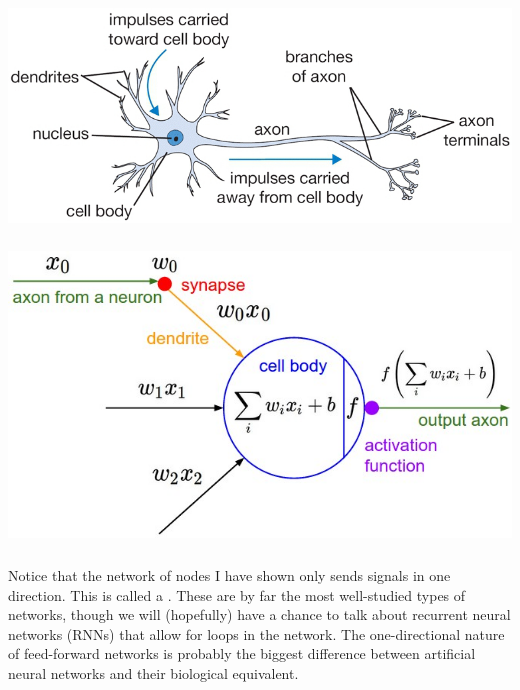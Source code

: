 \documentclass[xetex,mathserif,serif,aspectratio=169]{beamer}
\begin{document}
\begin{frame}[fragile] \frametitle{} \oldB \small

\begin{center}
\includegraphics[height=0.7\textheight]{img/neuron.png}
\end{center}

\end{frame}

\begin{frame}[fragile] \frametitle{} \oldB \small

\begin{center}
\includegraphics[height=0.7\textheight]{img/neuron_model.jpeg}
\end{center}

\end{frame}


\begin{frame}[fragile] \frametitle{} \oldB \small


Notice that the network of nodes I have shown only sends signals
in one direction. This is called a .
These are by far the most well-studied types of networks, though
we will (hopefully) have a chance to talk about recurrent neural
networks (RNNs) that allow for loops in the network. The one-directional
nature of feed-forward networks is probably the biggest difference
between artificial neural networks and their biological equivalent.

\end{frame}
\end{document}
